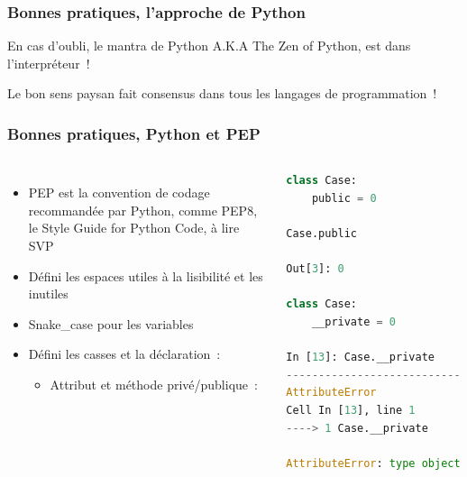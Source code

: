 \documentclass{beamer}
\begin{document}
    \begin{frame}[fragile]
        \transdissolve
        \frametitle{Bonnes pratiques, l'approche de Python}
        En cas d'oubli, le mantra de Python A.K.A The Zen of Python, est dans l'interpréteur~!

        \bigbreak

        Le bon sens paysan fait consensus dans tous les langages de programmation~!

    \end{frame}

    \begin{frame}[fragile]
        \transdissolve
        \frametitle{Bonnes pratiques, Python et PEP}
        \begin{columns}
            \begin{itemize}
                \item PEP est la convention de codage recommandée par Python, comme PEP8, le Style Guide for Python Code, à lire SVP
                \item Défini les espaces utiles à la lisibilité et les inutiles
                \item Snake\_case pour les variables
                \item Défini les casses et la déclaration~:
                \begin{itemize}
                    \item Attribut et méthode privé/publique~:
                \end{itemize}
            \end{itemize}
            \begin{lstlisting}[language=python]
class Case:
    public = 0

Case.public

Out[3]: 0

class Case:
    __private = 0

In [13]: Case.__private
---------------------------------------------------------------------------
AttributeError                            Traceback (most recent call last)
Cell In [13], line 1
----> 1 Case.__private

AttributeError: type object 'Case' has no attribute '__private'
            \end{lstlisting}
        \end{columns}
    \end{frame}
\end{document}
